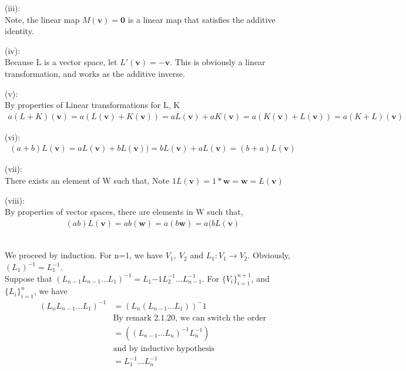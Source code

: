 \documentclass[letterpaper,12pt]{article}
\theoremstyle{definition}
\begin{document}
(iii):\\
Note, the linear map $M(\mathbf{v}) = \mathbf{0}$ is a linear map that satisfies the additive identity.

(iv):\\
Because L is a vector space, let $L'(\mathbf{v}) = -\mathbf{v}$. This is obviously a linear transformation, and works as the additive inverse.

(v): \\
By properties of Linear transformations for L, K
\begin{align*} 
    a(L+K)(\mathbf{v}) = a(L(\mathbf{v}) + K(\mathbf{v})) = aL(\mathbf{v}) + aK(\mathbf{v})
    = a(K(\mathbf{v})+L(\mathbf{v})) = a(K+L)(\mathbf{v})
\end{align*}

(vi):\\
\begin{align*} 
    (a+b)L(\mathbf{v}) = aL(\mathbf{v}) + bL(\mathbf{v})) = bL(\mathbf{v}) + aL(\mathbf{v})
    = (b+a)L(\mathbf{v}) 
\end{align*}

(vii):\\
There exists an element of W such that,
Note $1L(\mathbf{v}) =  1*\mathbf{w} = \mathbf{w} = L(\mathbf{v})$

(viii):\\
By properties of vector spaces, there are elements in W such that,
\begin{align*}
    (ab)L(\mathbf{v}) = ab(\mathbf{w}) = a(b\mathbf{w}) = a(bL(\mathbf{v})
\end{align*}



\\
We proceed by induction. For n=1, we have $V_1,~V_2$ and $L_1:V_1\rightarrow
V_2$. Obviously, $(L_1)^{-1} = L_1^{-1}$.\\
Suppose that $(L_{n-1}L_{n-1}\dots L_1)^{-1} = L_1{-1}L_2^{-1}\dots L_{n-1}^{-1}$.
For $\{V_i\}^{n+1} _{i=1}$, and $\{L_i\}^n_{i=1}$, we have \\
\begin{align*}
    (L_n L_{n-1}\dots L_{1})^{-1} & = (L_n(L_{n-1}\dots L_1))^-1 \\
    & \text{By remark 2.1.20, we can switch the order}\\
    & = ( (L_{n-1}\dots L_n)^{-1}L_n^{-1}) \\
    & \text{and by inductive hypothesis} \\
    & = L_1^{-1}\dots L_n^{-1}
\end{align*}
\end{document}
